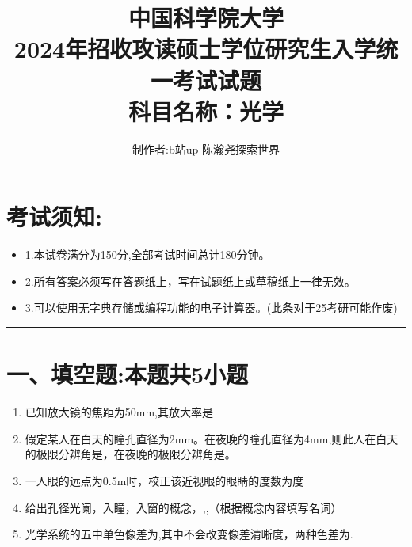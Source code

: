 \documentclass[11pt,a4paper]{article}
\begin{document}
    \title{中国科学院大学\\2024年招收攻读硕士学位研究生入学统一考试试题\\科目名称：光学}
    \author{制作者:b站up 陈瀚尧探索世界}
    \date{}
    \maketitle
    \titleformat{\section}[block]{\normalfont\Large\bfseries}{}{0pt}{}


    \section{考试须知:}
    \begin{itemize}[topsep=0pt,itemsep=0pt,partopsep=0pt]
        \item 1.本试卷满分为150分,全部考试时间总计180分钟。
        \vspace{-3mm}
        \item 2.所有答案必须写在答题纸上，写在试题纸上或草稿纸上一律无效。
        \vspace{-3mm}
        \item 3.可以使用无字典存储或编程功能的电子计算器。(此条对于25考研可能作废)
    \end{itemize}
    \vspace{-5mm}
    \noindent\rule{\textwidth}{0.5pt} %
    \vspace{-12mm}
    \section*{一、填空题:本题共5小题}
    \begin{enumerate}
        \vspace{0mm}
        \item 已知放大镜的焦距为50mm,其放大率是\underline{\makebox[2cm]{}}
        \vspace{-3mm}
        \item 假定某人在白天的瞳孔直径为2mm。在夜晚的瞳孔直径为4mm,则此人在白天的极限分辨角是\underline{\makebox[2cm]{}}，在夜晚的极限分辨角是\underline{\makebox[2cm]{}}。
        \vspace{-3mm}
        \item 一人眼的远点为0.5m时，校正该近视眼的眼睛的度数为\underline{\makebox[2cm]{}}度
        \vspace{-3mm}
        \item 给出孔径光阑，入瞳，入窗的概念，\underline{\makebox[2cm]{}},\underline{\makebox[2cm]{}},\underline{\makebox[2cm]{}}（根据概念内容填写名词）
        \vspace{-3mm}
        \item 光学系统的五中单色像差为\underline{\makebox[8cm]{}},其中\underline{\makebox[2cm]{}}不会改变像差清晰度，两种色差为\underline{\makebox[6cm]{}}.
        \vspace{-3mm}
    \end{enumerate}
\end{document}
